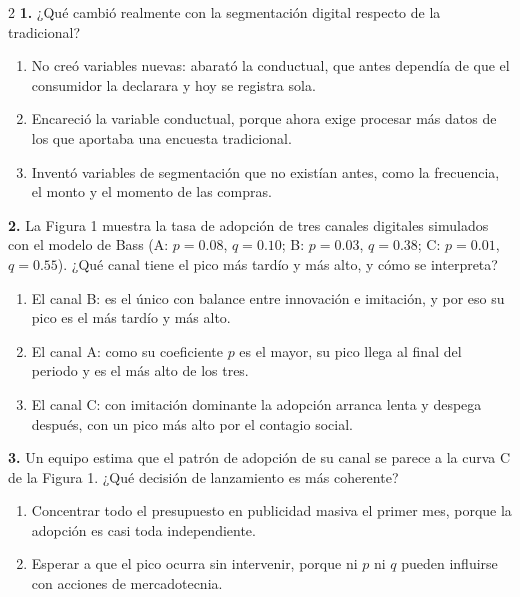 \documentclass[10pt,letterpaper]{article}
\begin{document}
\begin{multicols}{2}
\noindent\textbf{1.} ¿Qué cambió realmente con la segmentación digital respecto de la tradicional?
\vspace{-3pt}
\begin{enumerate}[label=\alph*),leftmargin=1.1em,itemsep=0pt,topsep=1pt,parsep=0pt,partopsep=0pt]
\item No creó variables nuevas: abarató la conductual, que antes dependía de que el consumidor la declarara y hoy se registra sola.
\item Encareció la variable conductual, porque ahora exige procesar más datos de los que aportaba una encuesta tradicional.
\item Inventó variables de segmentación que no existían antes, como la frecuencia, el monto y el momento de las compras.
\end{enumerate}
\vspace{2pt}
\noindent\textbf{2.} La Figura 1 muestra la tasa de adopción de tres canales digitales simulados con el modelo de Bass (A: $p=0.08$, $q=0.10$; B: $p=0.03$, $q=0.38$; C: $p=0.01$, $q=0.55$). ¿Qué canal tiene el pico más tardío y más alto, y cómo se interpreta?
\vspace{-3pt}
\begin{enumerate}[label=\alph*),leftmargin=1.1em,itemsep=0pt,topsep=1pt,parsep=0pt,partopsep=0pt]
\item El canal B: es el único con balance entre innovación e imitación, y por eso su pico es el más tardío y más alto.
\item El canal A: como su coeficiente $p$ es el mayor, su pico llega al final del periodo y es el más alto de los tres.
\item El canal C: con imitación dominante la adopción arranca lenta y despega después, con un pico más alto por el contagio social.
\end{enumerate}
\vspace{2pt}
\noindent\textbf{3.} Un equipo estima que el patrón de adopción de su canal se parece a la curva C de la Figura 1. ¿Qué decisión de lanzamiento es más coherente?
\vspace{-3pt}
\begin{enumerate}[label=\alph*),leftmargin=1.1em,itemsep=0pt,topsep=1pt,parsep=0pt,partopsep=0pt]
\item Concentrar todo el presupuesto en publicidad masiva el primer mes, porque la adopción es casi toda independiente.
\item Esperar a que el pico ocurra sin intervenir, porque ni $p$ ni $q$ pueden influirse con acciones de mercadotecnia.

\end{enumerate}
\end{multicols}
\end{document}
